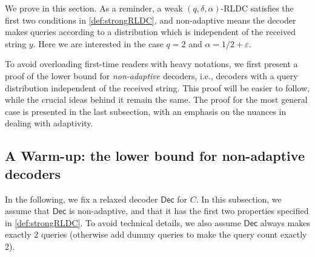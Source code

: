 \documentclass[10pt,a4paper]{article}
\theoremstyle{remark}
\newcommand{\eps}{\ensuremath{\varepsilon}}
\newcommand{\Dec}{\ensuremath{\mathsf{Dec}}\xspace}
\providecommand{\supp}{\operatorname{supp}}
\begin{document}
We prove  in this section. As a reminder, a weak $(q,\delta,\alpha)$-RLDC satisfies the first two conditions in \cref{def:strongRLDC}, and non-adaptive means the decoder makes queries according to a distribution which is independent of the received string $y$. Here we are interested in the case $q=2$ and $\alpha=1/2+\eps$.

To avoid overloading first-time readers with heavy notations, we first present a proof of the lower bound for \emph{non-adaptive} decoders, i.e., decoders with a query distribution independent of the received string. This proof will be easier to follow, while the crucial ideas behind it remain the same. The proof for the most general case is presented in the last subsection, with an emphasis on the nuances in dealing with adaptivity.

\subsection{A Warm-up: the lower bound for non-adaptive decoders}
In the following, we fix a relaxed decoder $\Dec$ for $C$. In this subsection, we assume that $\Dec$ is non-adaptive, and that it has the first two properties specified in \cref{def:strongRLDC}. To avoid technical details, we also assume $\Dec$ always makes exactly 2 queries (otherwise add dummy queries to make the query count exactly 2).

\end{document}
